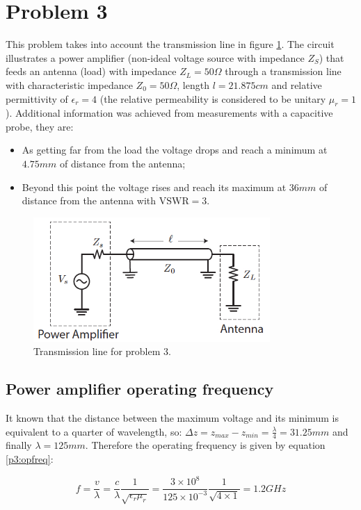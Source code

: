 \section{Problem 3}

This problem takes into account the transmission line in figure \ref{p3:TL}. The circuit illustrates a power amplifier (non-ideal voltage source with impedance $Z_S$) that feeds an antenna (load) with impedance $Z_L = 50 \Omega$ through a transmission line with characteristic impedance $Z_0=50 \Omega$, length $l=21.875 cm$ and relative permittivity of $\epsilon_r=4$ (the relative permeability is considered to be unitary $\mu_r = 1$). Additional information was achieved from measurements with a capacitive probe, they are:


\begin{itemize}
    \item As getting far from the load the voltage drops and reach a minimum at $4.75 mm$ of distance from the antenna;
    \item Beyond this point the voltage rises and reach its maximum at $36 mm$ of distance from the antenna with $\text{VSWR}=3$.
\end{itemize}

\begin{figure}[H] 
\centering
\includegraphics[width=9cm]{images/tl_ckt_p3.png}
\caption{Transmission line for problem 3.}
\label{p3:TL} 
\end{figure}

\subsection{Power amplifier operating frequency}

It known that the distance between the maximum voltage and its minimum is equivalent to a quarter of wavelength, so: $\Delta z = z_{max} - z_{min} = \frac{\lambda}{4} = 31.25mm$ and finally $\lambda = 125mm$. Therefore the operating frequency is given by equation \ref{p3:opfreq}: 

\begin{equation} \label{p3:opfreq}
    f = \frac{v}{\lambda} = \frac{c}{\lambda} \frac{1}{\sqrt{\epsilon_r \mu_r}} = \frac{3 \times 10^8}{125 \times 10^{-3}} \frac{1}{\sqrt{4 \times 1}} = 1.2 GHz
\end{equation}

